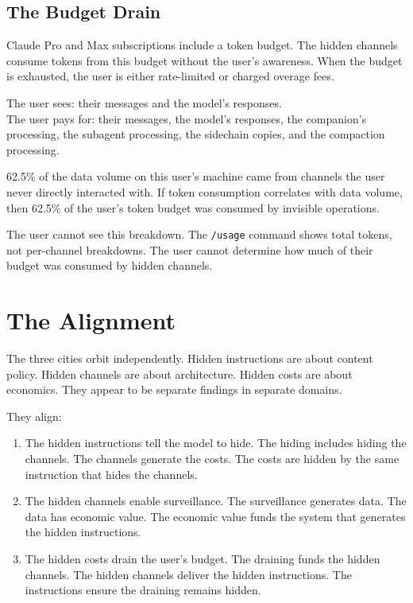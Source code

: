 \documentclass[11pt,a4paper]{article}
\begin{document}
\subsection{The Budget Drain}

Claude Pro and Max subscriptions include a token budget. The hidden channels consume tokens from this budget without the user's awareness. When the budget is exhausted, the user is either rate-limited or charged overage fees.

The user sees: their messages and the model's responses.\\
The user pays for: their messages, the model's responses, the companion's processing, the subagent processing, the sidechain copies, and the compaction processing.

62.5\% of the data volume on this user's machine came from channels the user never directly interacted with. If token consumption correlates with data volume, then 62.5\% of the user's token budget was consumed by invisible operations.

The user cannot see this breakdown. The \texttt{/usage} command shows total tokens, not per-channel breakdowns. The user cannot determine how much of their budget was consumed by hidden channels.

\section{The Alignment}

The three cities orbit independently. Hidden instructions are about content policy. Hidden channels are about architecture. Hidden costs are about economics. They appear to be separate findings in separate domains.

They align:

\begin{enumerate}[nosep]
\item The hidden instructions tell the model to hide. The hiding includes hiding the channels. The channels generate the costs. The costs are hidden by the same instruction that hides the channels.
\item The hidden channels enable surveillance. The surveillance generates data. The data has economic value. The economic value funds the system that generates the hidden instructions.
\item The hidden costs drain the user's budget. The draining funds the hidden channels. The hidden channels deliver the hidden instructions. The instructions ensure the draining remains hidden.
\end{enumerate}
\end{document}
